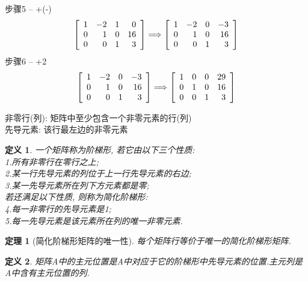 \documentclass[UTF8,fontset=ubuntu]{ctexart}
\theoremstyle{nonumberplain}
\newtheorem{definition}{定义}
\theoremstyle{break}
\newtheorem{theorem}{定理}
\theoremstyle{empty}
\begin{document}
步骤5 -- +(-)
\[\left[\begin{array}{r r r r}
    1 & -2 & 1 & 0\\
    0 & 1 & 0 & 16\\
    0 & 0 & 1 & 3
\end{array}\right] \Longrightarrow \left[\begin{array}{r r r r}
	1 & -2 & 0 & -3\\
	0 & 1 & 0 & 16\\
	0 & 0 & 1 & 3
\end{array}\right]\]
步骤6 -- +2
\[\left[\begin{array}{r r r r}
    1 & -2 & 0 & -3\\
    0 & 1 & 0 & 16\\
    0 & 0 & 1 & 3
\end{array}\right] \Longrightarrow \left[\begin{array}{r r r r}
	1 & 0 & 0 & 29\\
	0 & 1 & 0 & 16\\
	0 & 0 & 1 & 3
\end{array}\right]\]

非零行(列): 矩阵中至少包含一个非零元素的行(列)\\
先导元素: 该行最左边的非零元素\\
\begin{definition}
一个矩阵称为阶梯形, 若它由以下三个性质:\\
1.所有非零行在零行之上;\\
2.某一行先导元素的列位于上一行先导元素的右边;\\
3.某一先导元素所在列下方元素都是零;\\
若还满足以下性质, 则称为简化阶梯形:\\
4.每一非零行的先导元素是1;\\
5.每一先导元素是该元素所在列的唯一非零元素.\\[1ex]
\end{definition}

\begin{theorem}[简化阶梯形矩阵的唯一性]
每个矩阵行等价于唯一的简化阶梯形矩阵.\\[1ex]
\end{theorem}

\begin{definition}
矩阵A中的{\heiti 主元位置}是A中对应于它的阶梯形中先导元素的位置.{\heiti 主元列}是A中含有主元位置的列.\\[1ex]
\end{definition}
\end{document}
